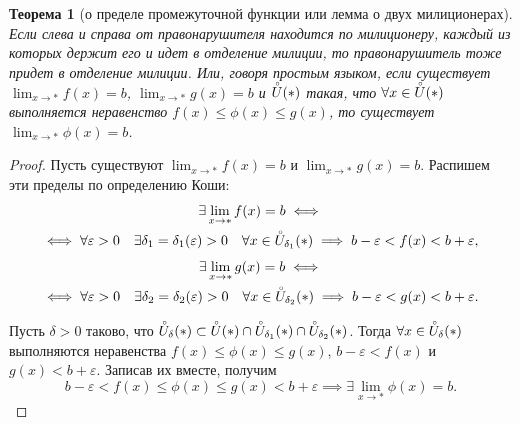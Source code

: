 \documentclass[a4paper,12pt]{article} %
\newtheorem{theorem}{Теорема}[section]
\theoremstyle{remark}
\theoremstyle{definition}
\begin{document}
\begin{theorem}[о пределе промежуточной функции или лемма о двух милиционерах]
	Если слева и справа от правонарушителя находится по милиционеру, каждый из которых держит его и идет в отделение милиции,
    то правонарушитель тоже придет в отделение милиции. Или, говоря простым языком, если существует $\lim_{x \to *} f(x) = b$,
    $\lim_{x \to *} g(x) = b$ и $\accentset{\circ}{U}(*)$ такая, что $\forall x\in \accentset{\circ}{U}(*)$ 
    выполняется неравенство $f(x) \le \phi(x) \le g(x)$, то существует $\lim_{x \to *} \phi(x) = b$.
\end{theorem}
\begin{proof}
	Пусть существуют $\lim_{x \to *} f(x) = b$ и $\lim_{x \to *} g(x) = b$. Распишем эти пределы по определению Коши:
	\begin{multline}
		\exists \lim_{x \to *} f(x) = b \iff \\
		\iff \forall \varepsilon>0 \quad \exists \delta_1 = \delta_1(\varepsilon) > 0 \quad \forall x\in \accentset{\circ}{U}_{\delta_1}(*) \implies b-\varepsilon < f(x) < b + \varepsilon,
	\end{multline}
	\begin{multline}
		\exists \lim_{x \to *} g(x) = b \iff \\
		\iff \forall \varepsilon>0 \quad \exists \delta_2 = \delta_2(\varepsilon) > 0 \quad \forall x\in \accentset{\circ}{U}_{\delta_2}(*) \implies b-\varepsilon < g(x) < b + \varepsilon.
	\end{multline}

	Пусть $\delta>0$ таково, что $\accentset{\circ}{U}_\delta(*) \subset \accentset{\circ}{U}(*)\cap \accentset{\circ}{U}_{\delta_1}(*) \cap \accentset{\circ}{U}_{\delta_2}(*)$. Тогда $\forall x \in \accentset{\circ}{U}_\delta(*)$ выполняются неравенства
	$f(x) \le \phi(x) \le g(x)$, $b-\varepsilon < f(x)$ и $g(x) < b + \varepsilon$.
	Записав их вместе, получим
	\[
	b - \varepsilon < f(x) \le \phi(x) \le g(x) < b + \varepsilon \implies \exists \lim_{x \to *} \phi(x) = b
	.\] 
\end{proof}
\end{document}
